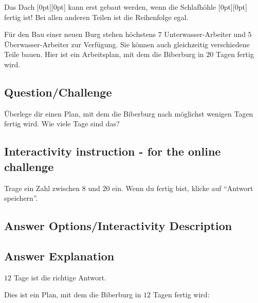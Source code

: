 \documentclass[a4paper,11pt]{report}
\newcommand{\taskGraphicsFolder}{..}
\begin{document}
Das Dach \raisebox{-0.5ex}[0pt][0pt]{} kann erst gebaut werden, wenn die Schlafhöhle \raisebox{-0.5ex}[0pt][0pt]{} fertig ist!  Bei allen anderen Teilen ist die Reihenfolge egal.

Für den Bau einer neuen Burg stehen höchstens $7$ Unterwasser-Arbeiter und $5$ Überwasser-Arbeiter zur Verfügung.
Sie können auch gleichzeitig verschiedene Teile bauen.
Hier ist ein Arbeitsplan, mit dem die Biberburg in $20$ Tagen fertig wird.

{\centering%
\par}

{\em

\subsection*{Question/Challenge}

Überlege dir einen Plan, mit dem die Biberburg nach möglichst wenigen Tagen fertig wird.
Wie viele Tage sind das?

}
\subsection*{Interactivity instruction - for the online challenge}

Trage ein Zahl zwischen $8$ und $20$ ein. Wenn du fertig bist, klicke auf \enquote{Antwort speichern}.

\begingroup
\renewcommand{\arraystretch}{1.5}
\subsection*{Answer Options/Interactivity Description}



\endgroup

\subsection*{Answer Explanation}

$12$ Tage ist die richtige Antwort.

Dies ist ein Plan, mit dem die Biberburg in $12$ Tagen fertig wird:

{\centering%
\par}
\end{document}
